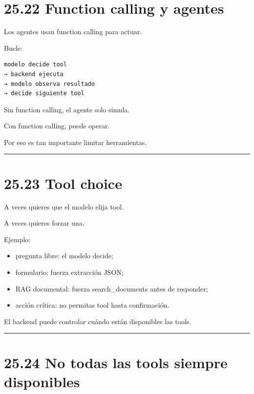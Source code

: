 \section{25.22 Function calling y
agentes}\label{function-calling-y-agentes}

Los agentes usan function calling para actuar.

Bucle:

\begin{lstlisting}
modelo decide tool
→ backend ejecuta
→ modelo observa resultado
→ decide siguiente tool
\end{lstlisting}

Sin function calling, el agente solo simula.

Con function calling, puede operar.

Por eso es tan importante limitar herramientas.

\begin{center}\rule{0.5\linewidth}{0.5pt}\end{center}

\section{25.23 Tool choice}\label{tool-choice}

A veces quieres que el modelo elija tool.

A veces quieres forzar una.

Ejemplo:

\begin{itemize}
\tightlist
\item
  pregunta libre: el modelo decide;
\item
  formulario: fuerza extracción JSON;
\item
  RAG documental: fuerza search\_documents antes de responder;
\item
  acción crítica: no permitas tool hasta confirmación.
\end{itemize}

El backend puede controlar cuándo están disponibles las tools.

\begin{center}\rule{0.5\linewidth}{0.5pt}\end{center}

\section{25.24 No todas las tools siempre
disponibles}\label{no-todas-las-tools-siempre-disponibles}

